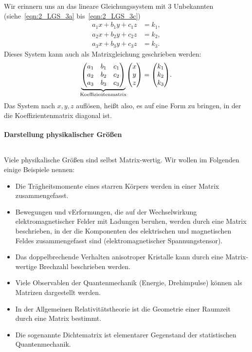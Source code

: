 Wir erinnern uns an das lineare Gleichungssystem mit 3 Unbekannten (siehe~\eqref{eqn:2_LGS_3a} bis~\eqref{eqn:2_LGS_3c})
\begin{subequations}
    \begin{align}
        a_1 x + b_1 y + c_1 z &= k_1, \\
        a_2 x + b_2 y + c_2 z &= k_2, \\
        a_3 x + b_3 y + c_3 z &= k_3.
    \end{align}
\end{subequations}
Dieses System kann auch als Matrixgleichung geschrieben werden: 
\begin{align}
    \underbrace{\mqty(a_1&b_1&c_1\\a_2&b_2&c_2\\a_3&b_3&c_3)}_{\mathclap{\text{Koeffizientenmatrix}}} \mqty(x\\y\\z) = \mqty(k_1\\k_2\\k_3).
\end{align}
Das System nach $x,y,z$ auflösen, heißt also, es auf eine Form zu bringen, in der die Koeffizientenmatrix diagonal ist.

\paragraph{Darstellung physikalischer Größen}$~$

Viele physikalische Größen sind selbst Matrix-wertig. Wir wollen im Folgenden einige Beispiele nennen:
\begin{itemize}
    \item Die Trägheitsmomente eines starren Körpers werden in einer Matrix zusammengefasst. 
    \item Bewegungen und vErformungen, die auf der Wechselwirkung elektromagnetischer Felder mit Ladungen beruhen, werden durch eine Matrix beschrieben, in der die Komponenten des elektrischen und magnetischen Feldes zusammengefasst sind (elektromagnetischer Spannungstensor).
    \item Das doppelbrechende Verhalten anisotroper Kristalle kann durch eine Matrix-wertige Brechzahl beschrieben werden. 
    \item Viele Observablen der Quantenmechanik (Energie, Drehimpulse) können als Matrizen dargestellt werden. 
    \item In der Allgemeinen Relativitätstheorie ist die Geometrie einer Raumzeit durch eine Matrix bestimmt.
    \item Die sogenannte Dichtematrix ist elementarer Gegenstand der statistischen Quantenmechanik.
\end{itemize}